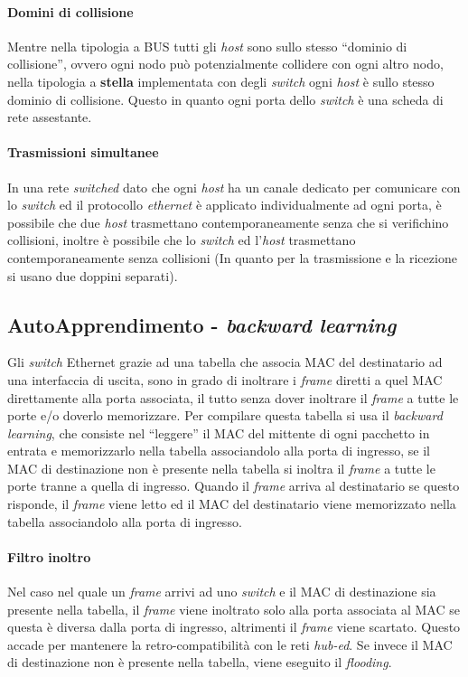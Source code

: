     \paragraph{Domini di collisione} Mentre nella tipologia a \Acrshort*{BUS} tutti gli \textit{host} sono sullo stesso ``dominio di collisione'', ovvero ogni nodo può potenzialmente collidere con ogni altro nodo, nella tipologia a \textbf{stella} implementata con degli \textit{switch} ogni \textit{host} è sullo stesso dominio di collisione. Questo in quanto ogni porta dello \textit{switch} è una scheda di rete assestante.
    \paragraph{Trasmissioni simultanee} In una rete \textit{switched} dato che ogni \textit{host} ha un canale dedicato per comunicare con lo \textit{switch} ed il protocollo \textit{ethernet} è applicato individualmente ad ogni porta, è possibile che due \textit{host} trasmettano contemporaneamente senza che si verifichino collisioni, inoltre è possibile che lo \textit{switch} ed l'\textit{host} trasmettano contemporaneamente senza collisioni (In quanto per la trasmissione e la ricezione si usano due doppini separati).
    \subsection{AutoApprendimento - \textit{backward learning}}
        Gli \textit{switch} Ethernet grazie ad una tabella che associa \Acrshort*{MAC} del destinatario ad una interfaccia di uscita, sono in grado di inoltrare i \textit{frame} diretti a quel \Acrshort*{MAC} direttamente alla porta associata, il tutto senza dover inoltrare il \textit{frame} a tutte le porte e/o doverlo memorizzare. Per compilare questa tabella si usa il \textit{backward learning}, che consiste nel ``leggere'' il \Acrshort*{MAC} del mittente di ogni pacchetto in entrata e memorizzarlo nella tabella associandolo alla porta di ingresso, se il \Acrshort*{MAC} di destinazione non è presente nella tabella si inoltra il \textit{frame} a tutte le porte tranne a quella di ingresso. Quando il \textit{frame} arriva al destinatario se questo risponde, il \textit{frame} viene letto ed il \Acrshort*{MAC} del destinatario viene memorizzato nella tabella associandolo alla porta di ingresso.
        \paragraph{Filtro inoltro} Nel caso nel quale un \textit{frame} arrivi ad uno \textit{switch} e il \Acrshort*{MAC} di destinazione sia presente nella tabella, il \textit{frame} viene inoltrato solo alla porta associata al \Acrshort*{MAC} se questa è diversa dalla porta di ingresso, altrimenti il \textit{frame} viene scartato. Questo accade per mantenere la retro-compatibilità con le reti \textit{hub-ed}. Se invece il \Acrshort*{MAC} di destinazione non è presente nella tabella, viene eseguito il \textit{flooding}.
